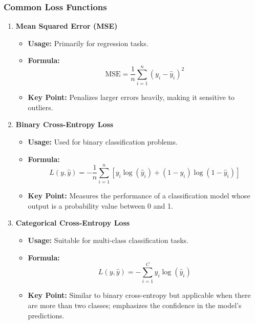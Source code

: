 \documentclass[aspectratio=169]{beamer}
\begin{document}
\begin{frame}[fragile]
    \frametitle{Common Loss Functions}
    \begin{enumerate}
        \item \textbf{Mean Squared Error (MSE)}
            \begin{itemize}
                \item \textbf{Usage:} Primarily for regression tasks.
                \item \textbf{Formula:} 
                \begin{equation}
                    \text{MSE} = \frac{1}{n} \sum_{i=1}^{n} (y_i - \hat{y}_i)^2
                \end{equation}
                \item \textbf{Key Point:} Penalizes larger errors heavily, making it sensitive to outliers.
            \end{itemize}
        
        \item \textbf{Binary Cross-Entropy Loss}
            \begin{itemize}
                \item \textbf{Usage:} Used for binary classification problems.
                \item \textbf{Formula:} 
                \begin{equation}
                    L(y, \hat{y}) = -\frac{1}{n} \sum_{i=1}^{n} [y_i \log(\hat{y}_i) + (1 - y_i) \log(1 - \hat{y}_i)]
                \end{equation}
                \item \textbf{Key Point:} Measures the performance of a classification model whose output is a probability value between 0 and 1.
            \end{itemize}
        
        \item \textbf{Categorical Cross-Entropy Loss}
            \begin{itemize}
                \item \textbf{Usage:} Suitable for multi-class classification tasks.
                \item \textbf{Formula:}
                \begin{equation}
                    L(y, \hat{y}) = -\sum_{i=1}^{C} y_i \log(\hat{y}_i)
                \end{equation}
                \item \textbf{Key Point:} Similar to binary cross-entropy but applicable when there are more than two classes; emphasizes the confidence in the model's predictions.
            \end{itemize}
    \end{enumerate}
\end{frame}
\end{document}
